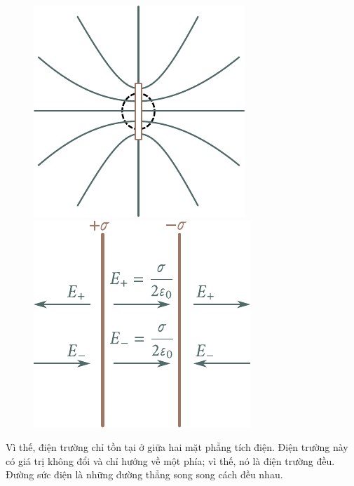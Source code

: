 \begin{figure}[!htb]
	\begin{minipage}[t]{0.5\linewidth}
		\begin{center}
			\includegraphics[scale=1]{figures/ch_01/fig_1_39.pdf}
			\caption[]{}
			\label{fig:1_39}
		\end{center}
	\end{minipage}
	\hspace{-0.05cm}
	\begin{minipage}[t]{0.5\linewidth}
		\begin{center}
			\includegraphics[scale=1]{figures/ch_01/fig_1_40.pdf}
			\caption[]{}
			\label{fig:1_40}
		\end{center}
	\end{minipage}
\vspace{-0.55cm}
\end{figure}

Vì thế, điện trường chỉ tồn tại ở giữa hai mặt phẳng tích điện. Điện trường này có giá trị không đổi và chỉ hướng về một phía; vì thế, nó là điện trường đều. Đường sức điện là những đường thẳng song song cách đều nhau.

